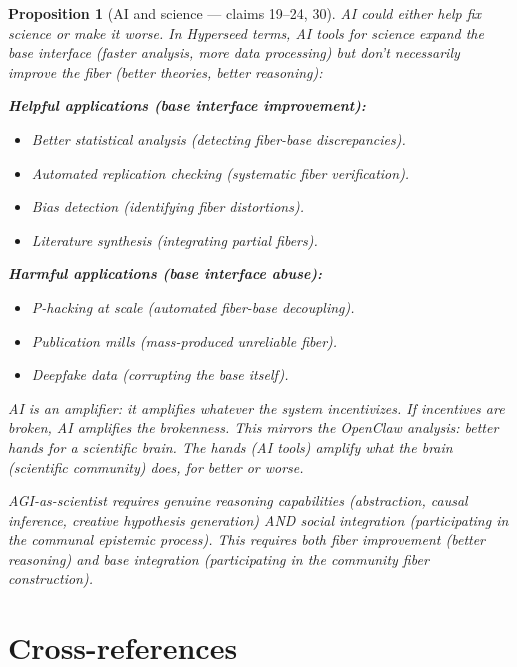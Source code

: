 \documentclass[11pt,a4paper]{article}
\newtheorem{proposition}[definition]{Proposition}
\begin{document}
\begin{proposition}[AI and science --- claims 19--24, 30]
\label{prop:ai}
AI could either help fix science or make it worse. In Hyperseed terms,
AI tools for science expand the base interface (faster analysis, more
data processing) but don't necessarily improve the fiber (better
theories, better reasoning):

\textbf{Helpful applications (base interface improvement):}
\begin{itemize}
\item Better statistical analysis (detecting fiber-base discrepancies).
\item Automated replication checking (systematic fiber verification).
\item Bias detection (identifying fiber distortions).
\item Literature synthesis (integrating partial fibers).
\end{itemize}

\textbf{Harmful applications (base interface abuse):}
\begin{itemize}
\item P-hacking at scale (automated fiber-base decoupling).
\item Publication mills (mass-produced unreliable fiber).
\item Deepfake data (corrupting the base itself).
\end{itemize}

AI is an amplifier: it amplifies whatever the system incentivizes. If
incentives are broken, AI amplifies the brokenness. This mirrors the
OpenClaw analysis: better hands for a scientific brain. The hands
(AI tools) amplify what the brain (scientific community) does, for
better or worse.

AGI-as-scientist requires genuine reasoning capabilities (abstraction,
causal inference, creative hypothesis generation) AND social integration
(participating in the communal epistemic process). This requires both
fiber improvement (better reasoning) and base integration (participating
in the community fiber construction).
\end{proposition}


\section{Cross-references}
\end{document}
